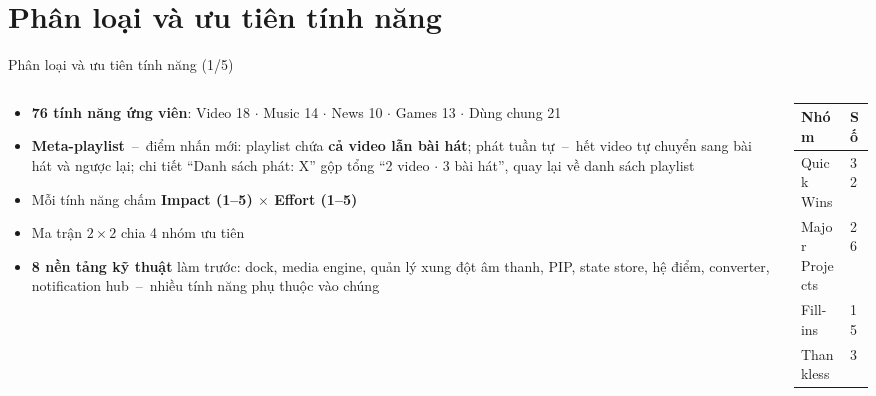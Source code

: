 \documentclass[aspectratio=169]{beamer}
\begin{document}
\section{Phân loại và ưu tiên tính năng}
\begin{frame}{Phân loại và ưu tiên tính năng (1/5)}
  \begin{columns}
    \begin{column}{0.56\textwidth}
      \begin{itemize}\small
        \item \textbf{76 tính năng ứng viên}: Video 18 $\cdot$ Music 14 $\cdot$ News 10 $\cdot$ Games 13 $\cdot$ Dùng chung 21
        \item \textbf{Meta-playlist}~--~điểm nhấn mới: playlist chứa \textbf{cả video lẫn bài hát}; phát tuần tự~--~hết video tự chuyển sang bài hát và ngược lại; chi tiết ``Danh sách phát: X'' gộp tổng ``2 video $\cdot$ 3 bài hát'', quay lại về danh sách playlist
        \item Mỗi tính năng chấm \textbf{Impact (1--5) $\times$ Effort (1--5)}
        \item Ma trận $2\times2$ chia 4 nhóm ưu tiên
        \item \textbf{8 nền tảng kỹ thuật} làm trước: dock, media engine, quản lý xung đột âm thanh, PIP, state store, hệ điểm, converter, notification hub~--~nhiều tính năng phụ thuộc vào chúng
      \end{itemize}
    \end{column}
    \begin{column}{0.38\textwidth}
      \small
      \begin{tabular}{@{}p{3.4cm}p{1.0cm}@{}}
        \toprule
        \textbf{Nhóm} & \textbf{Số} \\
        \midrule
        Quick Wins & 32 \\
        Major Projects & 26 \\
        Fill-ins & 15 \\
        Thankless & 3 \\
        \bottomrule
      \end{tabular}
    \end{column}
  \end{columns}
\end{frame}
\end{document}
